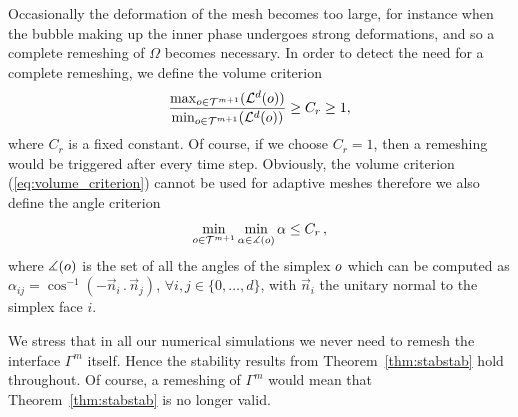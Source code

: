 Occasionally the deformation of the mesh becomes too large, for instance when
the bubble making up the inner phase undergoes strong deformations, and so a
complete remeshing of $\Omega$ becomes necessary. In order to detect the need
for a complete remeshing, we define the volume criterion
\begin{equation}\label{eq:volume_criterion}
\frac{\max_{o\in {\cal T}^{m+1}}(\mathcal{L}^d(o))}
{\min_{o\in\mathcal {T}^{m+1}}(\mathcal{L}^d(o))} \geq C_r \geq 1,
\end{equation}
where $C_r$ is a fixed constant. Of course, if we choose $C_r = 1$, then a
remeshing would be triggered after every time step. Obviously, the
volume criterion (\ref{eq:volume_criterion}) cannot be used for adaptive
meshes therefore we also define the angle criterion
\begin{equation}\label{eq:angle_criterion}
\min_{o\in {\cal T}^{m+1}}\min_{\alpha\in \measuredangle(o)}\alpha
\leq C_r\,,
\end{equation}
where $\measuredangle(o)$ is the set of all the angles of the simplex
$o$ which can be computed as $\alpha_{ij}=\cos^{-1}(-\vec n_i\,.\,\vec
n_j)$, $\forall i,j\in\{0,\dots,d\}$, with $\vec n_i$ the unitary normal to the
simplex face $i$.

We stress that in all our numerical simulations we never need to remesh the
interface $\Gamma^m$ itself. Hence the stability results from
Theorem~\ref{thm:stabstab} hold throughout. Of course, a remeshing of $\Gamma^m$
would mean that Theorem~\ref{thm:stabstab} is no longer valid.


